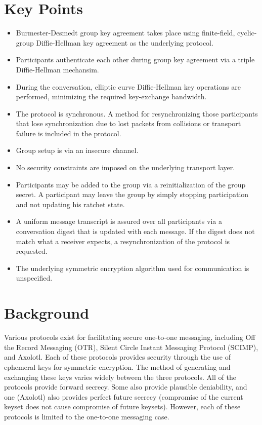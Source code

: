\documentclass[%
preprint,
amsmath,amssymb,
aps,
prb,
floatfix,
]{revtex4-1}
\begin{document}
\section{\label{sec:keypoints}Key Points}
\begin{itemize}
\item Burmester-Desmedt\cite{ref:burmester} group key agreement
takes place using finite-field, cyclic-group
Diffie-Hellman key agreement as the underlying protocol.
\item Participants authenticate each other during group key agreement via a
triple Diffie-Hellman mechansim.
\item During the conversation, elliptic curve Diffie-Hellman key operations
are performed, minimizing the required key-exchange bandwidth.
\item The protocol is synchronous. A method for resynchronizing those
participants that lose synchronization due to lost packets from collisions or
transport failure is included in the protocol.
\item Group setup is via an insecure channel.
\item No security constraints are imposed on the underlying transport layer.
\item Participants may be added to the group via a reinitialization of the
group secret. A participant may leave the group by simply stopping
participation and not updating his ratchet state.
\item A uniform message transcript is assured over all participants via a
conversation digest that is updated with each message. If the digest does not
match what a receiver expects, a resynchronization of the protocol is requested.
\item The underlying symmetric encryption algorithm used for communication is
unspecified.
\end{itemize}

\section{\label{sec:background}Background}
Various protocols exist for facilitating secure one-to-one messaging, including
Off the Record Messaging (OTR)\cite{ref:otr1,ref:raimondo,ref:otr2,ref:otr3,ref:otr}, Silent Circle Instant Messaging Protocol
(SCIMP)\cite{ref:scimp}, and Axolotl\cite{ref:axolotl}. Each of these protocols
provides security through the use of ephemeral keys for symmetric encryption.
The method of generating and exchanging these keys varies widely between the
three protocols. All of the protocols provide forward
secrecy. Some also provide plausible deniability, and one (Axolotl) also
provides perfect future secrecy (compromise of the current keyset does not cause
compromise of future keysets). However, each of these protocols is limited to
the one-to-one messaging case.
\end{document}

